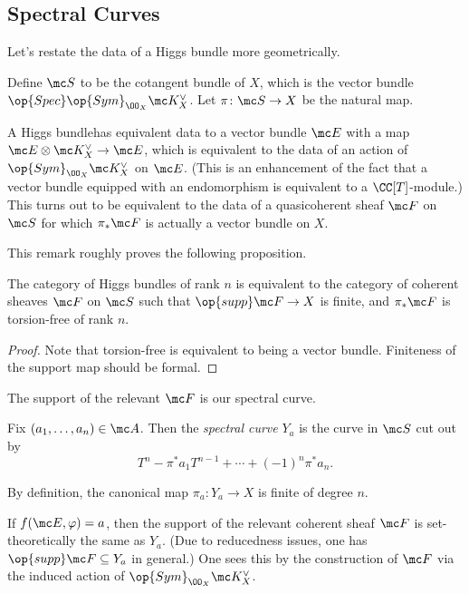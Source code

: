 \documentclass{article}
\begin{document}
\subsection{Spectral Curves}
Let's restate the data of a Higgs bundle more geometrically.
\begin{definition}
	Define $\mc S$ to be the cotangent bundle of $X$, which is the vector bundle $\op{Spec}\op{Sym}_{\OO_X}\mc K_X^\lor$. Let $\pi\colon\mc S\to X$ be the natural map.
\end{definition}
\begin{remark}
	A Higgs bundlehas equivalent data to a vector bundle $\mc E$ with a map $\mc E\otimes\mc K_X^\lor\to\mc E$, which is equivalent to the data of an action of $\op{Sym}_{\OO_X}\mc K_X^\lor$ on $\mc E$. (This is an enhancement of the fact that a vector bundle equipped with an endomorphism is equivalent to a $\CC[T]$-module.)  This turns out to be equivalent to the data of a quasicoherent sheaf $\mc F$ on $\mc S$ for which $\pi_*\mc F$ is actually a vector bundle on $X$.
\end{remark}
This remark roughly proves the following proposition.
\begin{proposition}
	The category of Higgs bundles of rank $n$ is equivalent to the category of coherent sheaves $\mc F$ on $\mc S$ such that $\op{supp}\mc F\to X$ is finite, and $\pi_*\mc F$ is torsion-free of rank $n$.
\end{proposition}
\begin{proof}
	Note that torsion-free is equivalent to being a vector bundle. Finiteness of the support map should be formal.
\end{proof}
The support of the relevant $\mc F$ is our spectral curve.
\begin{definition}
	Fix $(a_1,\ldots,a_n)\in\mc A$. Then the \textit{spectral curve} $Y_a$ is the curve in $\mc S$ cut out by
	\[T^n-\pi^*a_1T^{n-1}+\cdots+(-1)^n\pi^*a_n.\]
\end{definition}
\begin{remark}
	By definition, the canonical map $\pi_a\colon Y_a\to X$ is finite of degree $n$.
\end{remark}
\begin{example}
	If $f(\mc E,\varphi)=a$, then the support of the relevant coherent sheaf $\mc F$ is set-theoretically the same as $Y_a$. (Due to reducedness issues, one has $\op{supp}\mc F\subseteq Y_a$ in general.) One sees this by the construction of $\mc F$ via the induced action of $\op{Sym}_{\OO_X}\mc K_X^\lor$.
\end{example}
\end{document}
